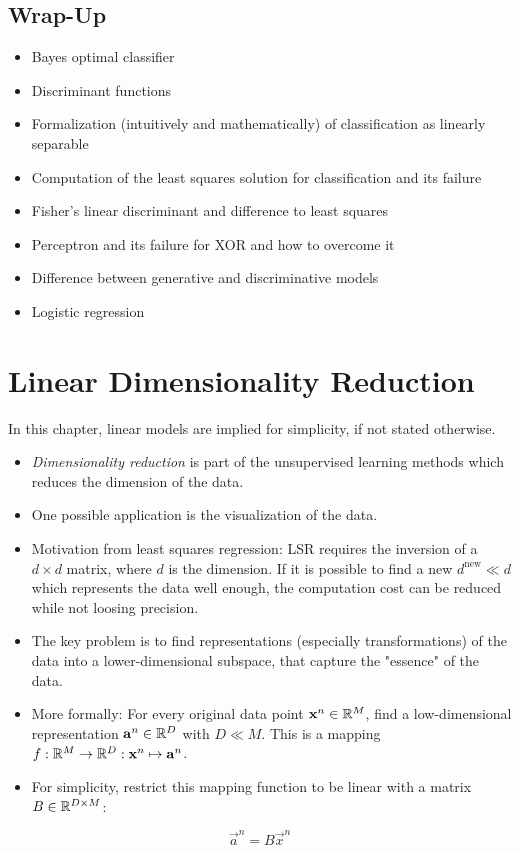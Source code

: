 	\section{Wrap-Up}
		\begin{itemize}
			\item Bayes optimal classifier
			\item Discriminant functions
			\item Formalization (intuitively and mathematically) of classification as linearly separable
			\item Computation of the least squares solution for classification and its failure
			\item Fisher's linear discriminant and difference to least squares
			\item Perceptron and its failure for XOR and how to overcome it
			\item Difference between generative and discriminative models
			\item Logistic regression
		\end{itemize}

\chapter{Linear Dimensionality Reduction}
	In this chapter, linear models are implied for simplicity, if not stated otherwise.
	
	\begin{itemize}
		\item \emph{Dimensionality reduction} is part of the unsupervised learning methods which reduces the dimension of the data.
		\item One possible application is the visualization of the data.
			\item Motivation from least squares regression: LSR requires the inversion of a \( d \times d \) matrix, where \(d\) is the dimension. If it is possible to find a new \( d^\textrm{new} \ll d \) which represents the data well enough, the computation cost can be reduced while not loosing precision.
			\item The key problem is to find representations (especially transformations) of the data into a lower-dimensional subspace, that capture the "essence" of the data.
			\item More formally: For every original data point \( \boldsymbol{\mathrm{x}}^n \in \mathbb{R}^M \), find a low-dimensional representation \( \boldsymbol{\mathrm{a}}^n \in \mathbb{R}^D \) with \( D \ll M \). This is a mapping \( f : \mathbb{R}^M \to \mathbb{R}^D : \boldsymbol{\mathrm{x}}^n \mapsto \boldsymbol{\mathrm{a}}^n \).
			\item For simplicity, restrict this mapping function to be linear with a matrix \( B \in \mathbb{R}^{D \times M} \):
	\end{itemize}
	\begin{equation}
		\vec{a}^n = B \vec{x}^n
	\end{equation}

